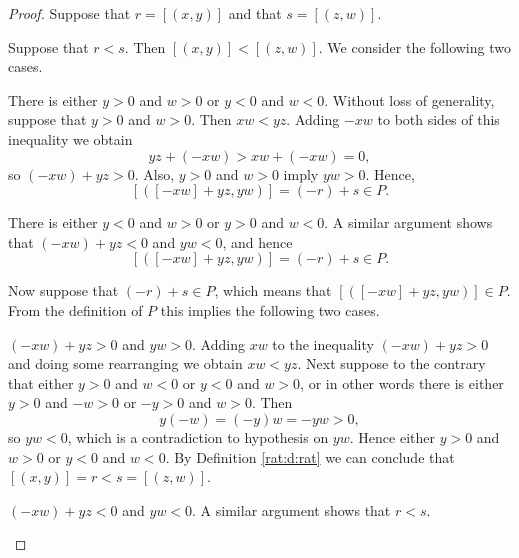 \begin{proof}
	Suppose that $r = [(x, y)]$ and that $s = [(z, w)]$.

	Suppose that $r < s$. Then $[(x, y)] < [(z, w)]$. We consider the following two cases.
	\begin{bycases}
		\item There is either $y > 0$ and $w > 0$ or $y < 0$ and $w < 0$. Without loss of generality, suppose that $y > 0$ and $w > 0$. Then $x w < y z$. Adding $-x w$ to both sides of this inequality we obtain
		      \[
			      y z + (-x w) > x w + (-x w) = 0,
		      \]
		      so $(-x w) + y z > 0$. Also, $y > 0$ and $w > 0$ imply $y w > 0$. Hence,
		      \[
			      [([-x w] + y z, y w)] = (-r) + s \in P.
		      \]
		\item There is either $y < 0$ and $w > 0$ or $y > 0$ and $w < 0$. A similar argument shows that $(-x w) + yz < 0$ and $y w < 0$, and hence
		      \[
			      [([-x w] + y z, y w)] = (-r) + s \in P.
		      \]
	\end{bycases}

	Now suppose that $(-r) + s \in P$, which means that $[([-x w] + y z, y w)] \in P$. From the definition of $P$ this implies the following two cases.
	\begin{bycases}
		\item $(-x w) + y z > 0$ and $y w > 0$. Adding $x w$ to the inequality $(-x w) + y z > 0$ and doing some rearranging we obtain $x w < y z$. Next suppose to the contrary that either $y > 0$ and $w < 0$ or $y < 0$ and $w > 0$, or in other words there is either $y > 0$ and $-w > 0$ or $-y > 0$ and $w > 0$. Then
		      \[
			      y(-w) = (-y)w = -yw > 0,
		      \]
		      so $y w < 0$, which is a contradiction to hypothesis on $y w$. Hence either $y > 0$ and $w > 0$ or $y < 0$ and $w < 0$. By Definition \ref{rat:d:rat} we can conclude that $[(x, y)] = r < s = [(z, w)]$.
		\item $(-x w) + y z < 0$ and $y w < 0$. A similar argument shows that $r < s$.
	\end{bycases}


\end{proof}

